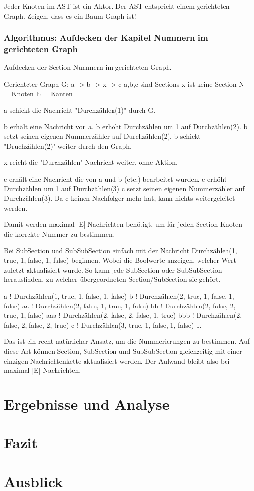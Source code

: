 Jeder Knoten im AST ist ein Aktor. Der AST entspricht einem gerichteten Graph.
Zeigen, dass es ein Baum-Graph ist!


\subsection{Algorithmus: Aufdecken der Kapitel Nummern im gerichteten Graph}

Aufdecken der Section Nummern im gerichteten Graph.

Gerichteter Graph G: a -> b -> x -> c
a,b,c sind Sections
x ist keine Section
N = Knoten
E = Kanten

a schickt die Nachricht "Durchzählen(1)" durch G.

b erhält eine Nachricht von a.
b erhöht Durchzählen um 1 auf Durchzählen(2).
b setzt seinen eigenen Nummerzähler auf Durchzählen(2).
b schickt "Druchzählen(2)" weiter durch den Graph.

x reicht die "Durchzählen" Nachricht weiter, ohne Aktion.

c erhält eine Nachricht die von a und b (etc.) bearbeitet wurden.
c erhöht Durchzählen um 1 auf Durchzählen(3)
c setzt seinen eigenen Nummerzähler auf Durchzählen(3).
Da c keinen Nachfolger mehr hat, kann nichts weitergeleitet werden.

Damit werden maximal |E| Nachrichten benötigt, um für jeden Section Knoten
die korrekte Nummer zu bestimmen.


Bei SubSection und SubSubSection einfach mit der
Nachricht Durchzählen(1, true, 1, false, 1, false) beginnen.
Wobei die Boolwerte anzeigen, welcher Wert zuletzt aktualisiert wurde.
So kann jede SubSection oder SubSubSection herausfinden, zu welcher
übergeordneten Section/SubSection sie gehört.

a ! Durchzählen(1, true, 1, false, 1, false)
b ! Durchzählen(2, true, 1, false, 1, false)
aa ! Durchzählen(2, false, 1, true, 1, false)
bb ! Durchzählen(2, false, 2, true, 1, false)
aaa ! Durchzählen(2, false, 2, false, 1, true)
bbb ! Durchzählen(2, false, 2, false, 2, true)
c ! Durchzählen(3, true, 1, false, 1, false)
...

Das ist ein recht natürlicher Ansatz, um die Nummerierungen zu bestimmen.
Auf diese Art können Section, SubSection und SubSubSection gleichzeitig
mit einer einzigen Nachrichtenkette aktualisiert werden.
Der Aufwand bleibt also bei maximal |E| Nachrichten.


\chapter{Ergebnisse und Analyse}


\chapter{Fazit}


\chapter{Ausblick}


